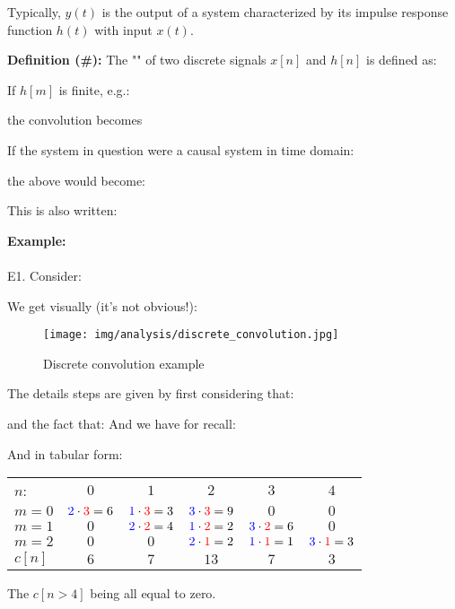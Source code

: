	Typically, $y(t)$ is the output of a system characterized by its impulse response function $h(t)$ with input $x(t)$.
	
	\textbf{Definition (\#\mydef):} The "" of two discrete signals $x[n]$ and $h[n]$ is defined as:
	
	If $h[m]$ is finite, e.g.:
	
	the convolution becomes
	
	If the system in question were a causal system in time domain:
	
	the above would become:
	
	This is also written:
	
	\begin{tcolorbox}[colframe=black,colback=white,sharp corners]
	\textbf{{\Large {}}Example:}\\\\
	E1. Consider:
	
	We get visually (it's not obvious!):
	\begin{figure}[H]
		\centering
		\texttt{[image: img/analysis/discrete\_convolution.jpg]}
		\caption{Discrete convolution example}
	\end{figure}
	The details steps are given by first considering that:
	
	and the fact that:
	And we have for recall:
	
	And in tabular form:
	\begin{table}[H]
	\centering
		\begin{tabular}{lccccc}
		$n$: & $0$ & $1$ & $2$ & $3$ & $4$ \\
		$m=0$ & ${\color{blue}{2}}\cdot {\color{red}{3}}=6$ & ${\color{blue}{1}}\cdot {\color{red}{3}}=3$ & ${\color{blue}{3}}\cdot {\color{red}{3}}=9$ & $0$ & $0$ \\
		$m=1$ & $0$ & ${\color{blue}{2}}\cdot {\color{red}{2}}=4$ & ${\color{blue}{1}}\cdot {\color{red}{2}}=2$ & ${\color{blue}{3}}\cdot {\color{red}{2}}=6$ & $0$ \\
		$m=2$ & $0$ & $0$ & ${\color{blue}{2}}\cdot {\color{red}{1}}=2$ & ${\color{blue}{1}}\cdot {\color{red}{1}}=1$ & ${\color{blue}{3}}\cdot {\color{red}{1}}=3$ \\ \hhline{|=|=|=|=|=|=|}
		$c[n]$ & $6$ & $7$ & $13$ & $7$ & $3$
		\end{tabular}
	\end{table}
	The $c[n>4]$ being all equal to zero.\\
	\end{tcolorbox}
